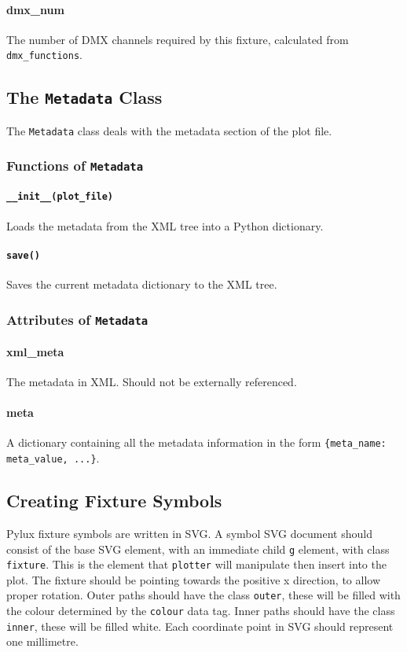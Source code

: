 \documentclass[a4paper]{article}
\begin{document}
\paragraph{dmx\_num}
The number of DMX channels required by this fixture, calculated from 
\texttt{dmx\_functions}.

\subsection{The \texttt{Metadata} Class}
The \texttt{Metadata} class deals with the metadata section of the plot file.

\subsubsection{Functions of \texttt{Metadata}}

\paragraph{\texttt{\_\_init\_\_(plot\_file)}}
Loads the metadata from the XML tree into a Python dictionary.

\paragraph{\texttt{save()}}
Saves the current metadata dictionary to the XML tree.

\subsubsection{Attributes of \texttt{Metadata}}

\paragraph{xml\_meta}
The metadata in XML. Should not be externally referenced.

\paragraph{meta}
A dictionary containing all the metadata information in the form 
\texttt{\{meta\_name: meta\_value, ...\}}.

\subsection{Creating Fixture Symbols}
Pylux fixture symbols are written in SVG. A symbol SVG document should 
consist of the base SVG element, with an immediate child \texttt{g} element, 
with class \texttt{fixture}. This is the element that \texttt{plotter} will 
manipulate then insert into the plot. The fixture should be pointing towards 
the positive x direction, to allow proper rotation. Outer paths should have 
the class \texttt{outer}, these will be filled with the colour determined by 
the \texttt{colour} data tag. Inner paths should have the class 
\texttt{inner}, these will be filled white. Each coordinate point in SVG 
should represent one millimetre.
\end{document}
